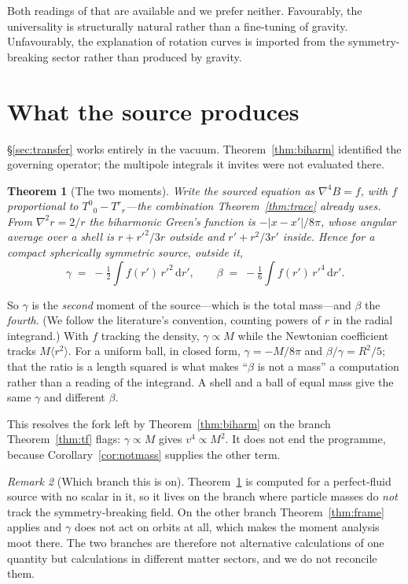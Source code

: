\documentclass[11pt]{article}
\newtheorem{theorem}{Theorem}[section]
\theoremstyle{definition}
\theoremstyle{remark}
\newtheorem{remark}[theorem]{Remark}
\newcommand{\dd}{\mathrm d}
\begin{document}
Both readings of that are available and we prefer neither.  Favourably, the
universality is structurally natural rather than a fine-tuning of gravity.
Unfavourably, the explanation of rotation curves is imported from the
symmetry-breaking sector rather than produced by gravity.

\section{What the source produces}
\label{sec:moments}

\S\ref{sec:transfer} works entirely in the vacuum.  Theorem~\ref{thm:biharm}
identified the governing operator; the multipole integrals it invites were not
evaluated there.

\begin{theorem}[The two moments]
\label{thm:moments}
Write the sourced equation as \(\nabla^{4}B=f\), with \(f\) proportional to
\(T^{0}{}_{0}-T^{r}{}_{r}\)---the combination Theorem~\ref{thm:trace} already
uses.  From \(\nabla^{2}r=2/r\) the biharmonic Green's function is
\(-|x-x'|/8\pi\), whose angular average over a shell is \(r+r'^{2}/3r\)
outside and \(r'+r^{2}/3r'\) inside.  Hence for a compact spherically
symmetric source, outside it,
\[
  \gamma \;=\; -\tfrac12\!\int\! f(r')\,r'^{2}\,\dd r',
  \qquad
  \beta \;=\; -\tfrac16\!\int\! f(r')\,r'^{4}\,\dd r'.
\]
\end{theorem}

So \(\gamma\) is the \emph{second} moment of the source---which is the total
mass---and \(\beta\) the \emph{fourth}.  (We follow the literature's
convention, counting powers of \(r\) in the radial integrand.)  With \(f\) tracking the density, \(\gamma\propto M\) while the
Newtonian coefficient tracks \(M\langle r^{2}\rangle\).  For a uniform ball,
in closed form, \(\gamma=-M/8\pi\) and \(\beta/\gamma=R^{2}/5\); that the
ratio is a length squared is what makes ``\(\beta\) is not a mass'' a
computation rather than a reading of the integrand.  A shell and a ball of
equal mass give the same \(\gamma\) and different \(\beta\).

This resolves the fork left by Theorem~\ref{thm:biharm} on the branch
Theorem~\ref{thm:tf} flags: \(\gamma\propto M\) gives \(v^{4}\propto M^{2}\).
It does not end the programme, because Corollary~\ref{cor:notmass} supplies
the other term.

\begin{remark}[Which branch this is on]
\label{rem:branch}
Theorem~\ref{thm:moments} is computed for a perfect-fluid source with no
scalar in it, so it lives on the branch where particle masses do \emph{not}
track the symmetry-breaking field.  On the other branch
Theorem~\ref{thm:frame} applies and \(\gamma\) does not act on orbits at all,
which makes the moment analysis moot there.  The two branches are therefore
not alternative calculations of one quantity but calculations in different
matter sectors, and we do not reconcile them.
\end{remark}
\end{document}
